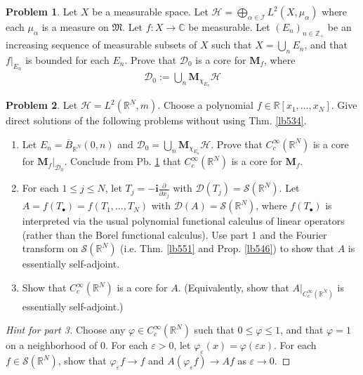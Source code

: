 \documentclass[12pt,b5paper,notitlepage]{article}
\theoremstyle{definition}
\newtheorem{prob}{\color{red}Problem}[section]
\theoremstyle{plain}
\newcommand{\fk}{\mathfrak}
\newcommand{\ovl}{\overline}
\newcommand{\Dom}{\mathscr{D}}
\newcommand{\im}{\mathbf{i}}
\newcommand{\blt}{\bullet}
\newcommand{\Cbb}{\mathbb C}
\newcommand{\Zbb}{\mathbb Z}
\newcommand{\Rbb}{\mathbb R}
\newcommand{\eps}{\varepsilon}
\newcommand{\MH}{\mathcal H}
\newcommand{\MS}{\mathcal S}
\newcommand{\SI}{\mathscr I}
\newcommand{\Mbf}{\mathbf M}
\numberwithin{equation}{section}
\begin{document}
\begin{prob}\label{lb538}
Let $X$ be a measurable space.  Let $\MH=\bigoplus_{\alpha\in\SI}L^2(X,\mu_\alpha)$ where each $\mu_\alpha$ is a measure on $\fk M$. Let $f:X\rightarrow\Cbb$ be measurable. Let $(E_n)_{n\in\Zbb_+}$ be an increasing sequence of measurable subsets of $X$ such that $X=\bigcup_n E_n$, and that $f|_{E_n}$ is bounded for each $E_n$. Prove that $\Dom_0$ is a core for $\Mbf_f$, where
\begin{align*}
\Dom_0:=\bigcup_n \Mbf_{\chi_{E_n}}\MH
\end{align*}
\end{prob}

\begin{prob}\label{lb539}
Let $\MH=L^2(\Rbb^N,m)$. Choose a polynomial $f\in\Rbb[x_1,\dots,x_N]$. Give direct solutions of the following problems without using Thm. \ref{lb534}.
\begin{enumerate}
\item Let $E_n=\ovl B_{\Rbb^N}(0,n)$ and $\Dom_0=\bigcup_n\Mbf_{\chi_{E_n}}\MH$. Prove that $C_c^\infty(\Rbb^N)$ is a core for $\Mbf_f|_{\Dom_0}$. Conclude from Pb. \ref{lb538} that $C_c^\infty(\Rbb^N)$ is a core for $\Mbf_f$.
\item For each $1\leq j\leq N$, let $T_j=-\im\frac\partial{\partial x_j}$ with $\Dom(T_j)=\MS(\Rbb^N)$. Let $A=f(T_\blt)=f(T_1,\dots,T_N)$ with $\Dom(A)=\MS(\Rbb^N)$, where $f(T_\blt)$ is interpreted via the usual polynomial functional calculus of linear operators (rather than the Borel functional calculus). Use part 1 and the Fourier transform on $\MS(\Rbb^N)$ (i.e. Thm. \ref{lb551} and Prop. \ref{lb546}) to show that $A$ is essentially self-adjoint. 
\item Show that $C_c^\infty(\Rbb^N)$ is a core for $A$. (Equivalently, show that $A|_{C_c^\infty(\Rbb^N)}$ is essentially self-adjoint.)
\end{enumerate}
\end{prob}

\begin{proof}[Hint for part 3]
Choose any $\varphi\in C_c^\infty(\Rbb^N)$ such that $0\leq\varphi\leq 1$, and that $\varphi=1$ on a neighborhood of $0$. For each $\eps>0$, let $\varphi_\eps(x)=\varphi(\eps x)$. For each $f\in\MS(\Rbb^N)$, show that $\varphi_\eps f\rightarrow f$ and $A(\varphi_\eps f)\rightarrow Af$ as $\eps\rightarrow0$.
\end{proof}




\hypertarget{current}{}
\end{document}
